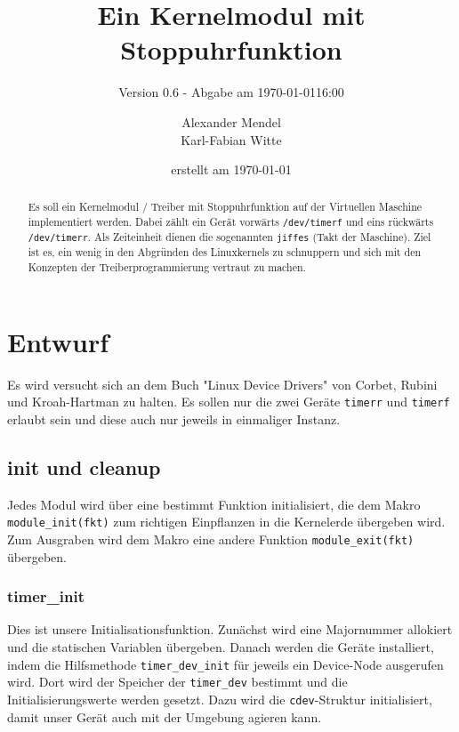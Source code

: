 \documentclass[
   draft=false
  ,paper=a4
  ,twoside=false
  ,fontsize=11pt
  ,headsepline
  ,BCOR10mm
  ,DIV11
  ,parskip=full+
]{scrartcl} %
\begin{document}
\titlehead{Betriebssysteme WS 2016 Praktikum 04}%
\subject{BS Praktikumsaufgabe 04}
\title{Ein Kernelmodul mit Stoppuhrfunktion}
\subtitle{Version 0.6 - Abgabe am \today 16:00}
\author{Alexander Mendel \\ Karl-Fabian Witte}
\date{erstellt am \today}%
\maketitle%
\begin{abstract}
    Es soll ein Kernelmodul / Treiber  mit Stoppuhrfunktion auf der
    Virtuellen Maschine implementiert werden. Dabei zählt ein Gerät vorwärts
    \texttt{/dev/timerf} und eins rückwärts \texttt{/dev/timerr}. Als
    Zeiteinheit dienen die sogenannten \texttt{jiffes} (Takt der Maschine).
    Ziel ist es, ein wenig in den Abgründen des Linuxkernels zu schnuppern und
    sich mit den Konzepten der Treiberprogrammierung vertraut zu machen.
\end{abstract}
\tableofcontents
\flushleft
\section{Entwurf}
Es wird versucht sich an dem Buch "{}Linux Device Drivers"{} von Corbet,
Rubini und Kroah-Hartman zu halten. Es sollen nur die zwei Geräte
\texttt{timerr} und \texttt{timerf} erlaubt sein und diese auch nur jeweils in
einmaliger Instanz.

\subsection{init und cleanup}
Jedes Modul wird über eine bestimmt Funktion initialisiert, die dem Makro
\texttt{module\_init(fkt)} zum richtigen Einpflanzen in die Kernelerde
übergeben wird. Zum Ausgraben wird dem Makro eine andere Funktion
\texttt{module\_exit(fkt)} übergeben.

\subsubsection{timer\_init}
    Dies ist unsere Initialisationsfunktion. Zunächst wird eine Majornummer
    allokiert und die statischen Variablen übergeben. Danach werden die
    Geräte installiert, indem die Hilfsmethode \texttt{timer\_dev\_init}
    für jeweils ein Device-Node ausgerufen wird. Dort wird der Speicher
    der \texttt{timer\_dev} bestimmt und die Initialisierungswerte werden gesetzt.
    Dazu wird die \texttt{cdev}-Struktur initialisiert, damit unser Gerät
    auch mit der Umgebung agieren kann.
\end{document}
